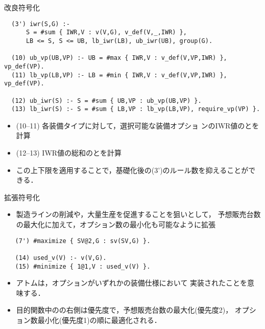\documentclass[dvipdfmx, 11pt]{beamer}
\begin{document}
\begin{frame}[fragile]{改良符号化}
\begin{exampleblock}{}
\footnotesize
\begin{lstlisting}
  (3') iwr(S,G) :- 
      S = #sum { IWR,V : v(V,G), v_def(V,_,IWR) },
      LB <= S, S <= UB, lb_iwr(LB), ub_iwr(UB), group(G).

  (10) ub_vp(UB,VP) :- UB = #max { IWR,V : v_def(V,VP,IWR) }, vp_def(VP).
  (11) lb_vp(LB,VP) :- LB = #min { IWR,V : v_def(V,VP,IWR) }, vp_def(VP).

  (12) ub_iwr(S) :- S = #sum { UB,VP : ub_vp(UB,VP) }.
  (13) lb_iwr(S) :- S = #sum { LB,VP : lb_vp(LB,VP), require_vp(VP) }.
\end{lstlisting}
\end{exampleblock}
 \begin{itemize}
 \item (10--11) 各装備タイプに対して，選択可能な装備オプショ
   ンのIWR値のとを計算
 \item (12--13) IWR値の総和のとを計算
 \item この上下限を適用することで，基礎化後の(3')のルール数を抑えることができる．
 \end{itemize}
\end{frame}
\begin{frame}[fragile]{拡張符号化}
 \begin{itemize}
  \item 製造ラインの削減や，大量生産を促進することを狙いとして，
	予想販売台数の最大化に加えて，オプション数の最小化も可能なように拡張
 \end{itemize}
 \begin{exampleblock}{}
  \begin{lstlisting}
   (7') #maximize { SV@2,G : sv(SV,G) }.

   (14) used_v(V) :- v(V,G).
   (15) #minimize { 1@1,V : used_v(V) }.
  \end{lstlisting}
 \end{exampleblock}
 \begin{itemize}
  \item アトムは，オプションがいずれかの装備仕様において
	実装されたことを意味する．
  \item 目的関数中のの右側は優先度で，予想販売台数の最大化(優先度2)，
	オプション数最小化(優先度1)の順に最適化される．
 \end{itemize}
\end{frame}
\end{document}
